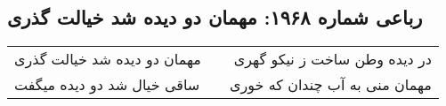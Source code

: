 \begin{center}
\section*{رباعی شماره ۱۹۶۸: مهمان دو دیده شد خیالت گذری}
\label{sec:1968}
\begin{longtable}{l p{0.5cm} r}
مهمان دو دیده شد خیالت گذری
&&
در دیده وطن ساخت ز نیکو گهری
\\
ساقی خیال شد دو دیده میگفت
&&
مهمان منی به آب چندان که خوری
\\
\end{longtable}
\end{center}
